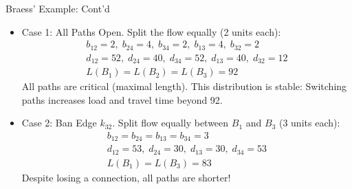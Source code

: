 \documentclass[10pt]{beamer}
\begin{document}
\begin{frame}{Braess' Example: Cont'd}
  \begin{itemize}[<+->]
    \item Case 1: All Paths Open. Split the flow equally (2 units each):
    \onslide<+->
    \begin{gather*}
      b_{12} = 2, \; b_{24} = 4, \; b_{34} = 2, \;b_{13} = 4, \; b_{32} = 2\\
      d_{12} = 52, \; d_{24} = 40, \; d_{34} = 52, \; d_{13} = 40, \; d_{32} = 12 \\
      L(B_1) = L(B_2) = L(B_3) = 92
    \end{gather*}
    \onslide<+->
    All paths are critical (maximal length). This distribution is stable: Switching paths increases load and travel time beyond 92.

    \item Case 2: Ban Edge $k_{32}$. Split flow equally between $B_1$ and $B_3$ (3 units each):
    \onslide<+->
    \begin{gather*}
      b_{12} = b_{24} = b_{13} = b_{34} = 3\\
      d_{12} = 53, \; d_{24} = 30, \; d_{13} = 30, \; d_{34} = 53\\
      L(B_1) = L(B_3) = 83
    \end{gather*}
    \onslide<+->
    Despite losing a connection, all paths are shorter!
\end{itemize}
\end{frame}
\end{document}
